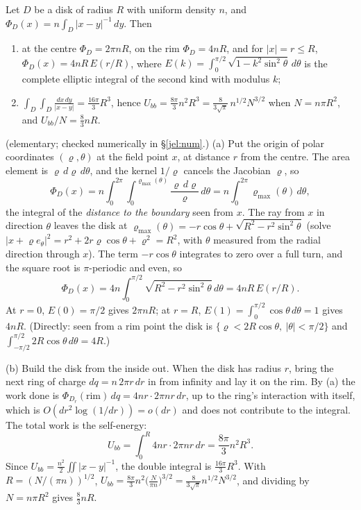 \begin{proposition}[the uniform disk, $g=1/r$]\label{jel:prop:disk}
Let $D$ be a disk of radius $R$ with uniform density $n$, and $\Phi_D(x)=n\int_D|x-y|^{-1}\,dy$. Then
\begin{enumerate}[label=(\alph*)]
\item at the centre $\Phi_D=2\pi nR$, on the rim $\Phi_D=4nR$, and for $|x|=r\le R$,
  $\Phi_D(x)=4nR\,E(r/R)$, where $E(k)=\int_0^{\pi/2}\sqrt{1-k^2\sin^2\theta}\,d\theta$ is the complete elliptic
  integral of the second kind with modulus $k$;
\item $\displaystyle\int_D\!\int_D\frac{dx\,dy}{|x-y|}=\frac{16\pi}3R^3$, hence
  $\displaystyle U_{bb}=\frac{8\pi}3n^2R^3=\frac{8}{3\sqrt\pi}\,n^{1/2}N^{3/2}$ when $N=n\pi R^2$, and
  $U_{bb}/N=\frac83nR$.
\end{enumerate}
\end{proposition}
\begin{humanproof}
\tierC{} (elementary; checked numerically in \S\ref{jel:num}.)
(a) Put the origin of polar coordinates $(\varrho,\theta)$ at the field point $x$, at distance $r$ from the centre.
The area element is $\varrho\,d\varrho\,d\theta$, and the kernel $1/\varrho$ cancels the Jacobian $\varrho$, so
\[
\Phi_D(x)=n\int_0^{2\pi}\!\!\int_0^{\varrho_{\max}(\theta)}\frac{\varrho\,d\varrho}{\varrho}\,d\theta
=n\int_0^{2\pi}\varrho_{\max}(\theta)\,d\theta ,
\]
the integral of the \emph{distance to the boundary} seen from $x$. The ray from $x$ in direction $\theta$ leaves the
disk at $\varrho_{\max}(\theta)=-r\cos\theta+\sqrt{R^2-r^2\sin^2\theta}$ (solve $|x+\varrho e_\theta|^2=r^2+2r\varrho\cos\theta+\varrho^2=R^2$,
with $\theta$ measured from the radial direction through $x$). The term
$-r\cos\theta$ integrates to zero over a full turn, and the square root is $\pi$-periodic and even, so
\[
\Phi_D(x)=4n\int_0^{\pi/2}\sqrt{R^2-r^2\sin^2\theta}\,d\theta=4nR\,E(r/R).
\]
At $r=0$, $E(0)=\pi/2$ gives $2\pi nR$; at $r=R$, $E(1)=\int_0^{\pi/2}\cos\theta\,d\theta=1$ gives $4nR$. (Directly: seen
from a rim point the disk is $\{\varrho<2R\cos\theta,\ |\theta|<\pi/2\}$ and $\int_{-\pi/2}^{\pi/2}2R\cos\theta\,d\theta=4R$.)

(b) Build the disk from the inside out. When the disk has radius $r$, bring the next ring of charge
$dq=n\,2\pi r\,dr$ in from infinity and lay it on the rim. By (a) the work done is $\Phi_{D_r}(\text{rim})\,dq=4nr\cdot
2\pi nr\,dr$, up to the ring's interaction with itself, which is $O(dr^2\log(1/dr))=o(dr)$ and does not contribute to
the integral. The total work is the self-energy:
\[
U_{bb}=\int_0^R4nr\cdot2\pi nr\,dr=\frac{8\pi}3n^2R^3 .
\]
Since $U_{bb}=\frac{n^2}2\iint|x-y|^{-1}$, the double integral is $\frac{16\pi}3R^3$. With $R=(N/(\pi n))^{1/2}$,
$U_{bb}=\frac{8\pi}{3}n^2\bigl(\frac N{\pi n}\bigr)^{3/2}=\frac8{3\sqrt\pi}n^{1/2}N^{3/2}$, and dividing by $N=n\pi R^2$
gives $\frac83nR$.
\end{humanproof}

